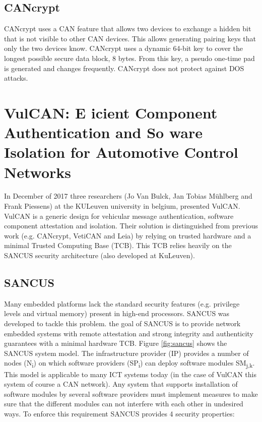 \documentclass[11pt]{article}
\begin{document}
\subsection{CANcrypt}

CANcrypt uses a CAN feature that allows two devices to exchange a hidden bit that is not visible to other CAN devices. This allows generating pairing keys that only the two devices know. CANcrypt uses a dynamic 64-bit key to cover the longest possible secure data block, 8 bytes. From this key, a pseudo one-time pad is generated and changes frequently. CANcrypt does not protect against DOS attacks.\cite{Pfeiffer}

\section{VulCAN: E icient Component Authentication and So ware Isolation for Automotive Control Networks}

In December of 2017 three researchers (Jo Van Bulck, Jan Tobias Mühlberg and Frank Piessens) at the KULeuven university in belgium, presented VulCAN. VulCAN is a generic design for vehicular message authentication, software component attestation and isolation. Their solution is distinguished from previous work (e.g. CANcrypt\cite{Pfeiffer}, VetiCAN\cite{VatiCAN} and Leia\cite{Leia}) by relying on trusted hardware and a minimal Trusted Computing Base (TCB). This TCB relies heavily on the SANCUS\cite{Sancus} security architecture (also developed at KuLeuven).

\subsection{SANCUS}

Many embedded platforms lack the standard security features (e.g. privilege levels and  virtual memory) present in high-end processors. SANCUS was developed to tackle this problem. the goal of SANCUS is to provide network embedded systems with remote attestation and strong integrity and authenticity guarantees with a minimal hardware TCB. Figure \ref{fig:sancus} shows the SANCUS system model. The infrastructure provider (IP) provides a number of nodes (N\textsubscript{i}) on which software providers (SP\textsubscript{i}) can deploy software modules SM\textsubscript{j,k}. This model is applicable to many ICT systems today (in the case of VulCAN this system of course a CAN network). Any system that supports installation of software modules by several software providers must implement measures to make sure that the different modules can not interfere with each other in undesired ways. To enforce this requirement SANCUS provides 4 security properties:
\end{document}
